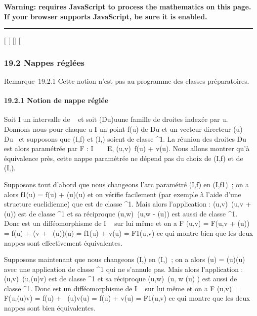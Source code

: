 \textbf{Warning: 
requires JavaScript to process the mathematics on this page.\\ If your
browser supports JavaScript, be sure it is enabled.}

\begin{center}\rule{3in}{0.4pt}\end{center}

{[}
{[}
{[}{]}
{[}

\subsubsection{19.2 Nappes réglées}

Remarque~19.2.1 Cette notion n'est pas au programme des classes
préparatoires.

\paragraph{19.2.1 Notion de nappe réglée}

Soit I un intervalle de ~ et soit (Du)u\inI une
famille de droites indexée par u. Donnons nous pour chaque u \in I un
point f(u) de Du et un vecteur directeur
\vecg(u) \in\overrightarrow
Du \diagdown\0\ et supposons que
(I,f) et (I,\vecg) soient de classe ^1.
La réunion des droites Du est alors paramétrée par F : I \times {}~ \rightarrow~
E, (u,v)\mapsto~f(u) + v\vecg(u).
Nous allons montrer qu'à équivalence près, cette nappe paramétrée ne
dépend pas du choix de (I,f) et de (I,\vecg).

Supposons tout d'abord que nous changeons l'arc paramétré (I,f) en
(I,f1)~; on a alors f1(u) = f(u) +
\phi(u)\vecg(u) et on vérifie facilement (par exemple à
l'aide d'une structure euclidienne) que \phi est de classe ^1.
Mais alors l'application \theta : (u,v)\mapsto~(u,v +
\phi(u)) est de classe ^1 et sa réciproque
(u,w)\mapsto~(u,w - \phi(u)) est aussi de classe
^1. Donc \theta est un difféomorphisme de I \times {}~ sur lui même et
on a F \cdot \theta(u,v) = F(u,v + \phi(u)) = f(u) + (v +
\alpha~(u))\vecg(u) = f1(u) +
v\vecg(u) = F1(u,v) ce qui montre bien que
les deux nappes sont effectivement équivalentes.

Supposons maintenant que nous changeons (I,\vecg) en
(I,)~; on a alors
(u) = \psi(u)\vecg(u)
avec une application \psi de classe ^1 qui ne s'annule pas.
Mais alors l'application \theta : (u,v)\mapsto~(u,\psi(u)v)
est de classe ^1 et sa réciproque
(u,w)\mapsto~(u, w \over \psi(u) )
est aussi de classe ^1. Donc \theta est un difféomorphisme de I \times
{}~ sur lui même et on a F \cdot \theta(u,v) = F(u,\psi(u)v) = f(u) +
\beta~(u)v\vecg(u) = f(u) +
v(u) = F1(u,v) ce qui
montre que les deux nappes sont bien équivalentes.

